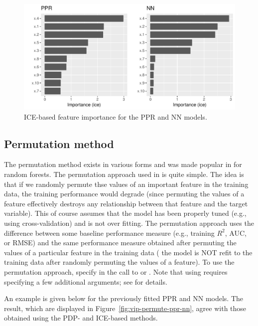 \begin{figure}[!htb]
  \centering 
  \includegraphics[width=1\linewidth]{figures/vip-ice-ppr-nn} 
  \caption{ICE-based feature importance for the PPR and NN models.}
  \label{fig:vip-ice-ppr-nn}
\end{figure}


\subsection{Permutation method}

The permutation method exists in various forms and was made popular in \citet{random-breiman-2001} for random forests. The permutation approach used in  is quite simple. The idea is that if we randomly permute thse values of an important feature in the training data, the training performance would degrade (since permuting the values of a feature effectively destroys any relationship between that feature and the target variable). This of course assumes that the model has been properly tuned (e.g., using cross-validation) and is not over fitting. The permutation approach uses the difference between some baseline performance measure (e.g., training $R^2$, AUC, or RMSE) and the same performance measure obtained after permuting the values of a particular feature in the training data ( the model is NOT refit to the training data after randomly permuting the values of a feature). To use the permutation approach, specify  in the call to  or . Note that using  requires specifying a few additional arguments; see  for details.

An example is given below for the previously fitted PPR and NN models. The result, which are displayed in Figure~\ref{fig:vip-permute-ppr-nn}, agree with those obtained using the PDP- and ICE-based methods.

